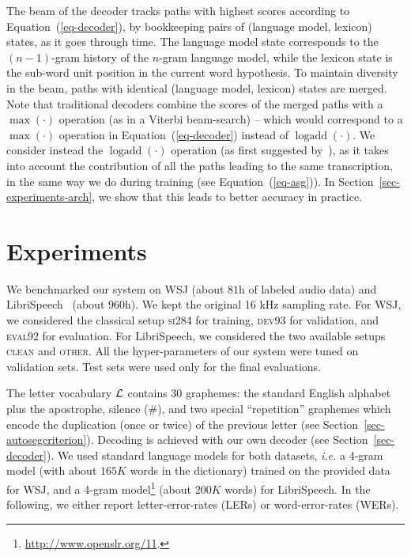 \documentclass{article}
\DeclareMathOperator*{\logadd}{logadd}
\begin{document}
The beam of the decoder tracks paths with highest scores according to
Equation~(\ref{eq-decoder}), by bookkeeping pairs of (language model,
lexicon) states, as it goes through time. The language model state
corresponds to the $(n-1)$-gram history of the $n$-gram language model,
while the lexicon state is the sub-word unit position in the current word
hypothesis. To maintain diversity in the beam, paths with identical
(language model, lexicon) states are merged. Note that traditional decoders
combine the scores of the merged paths with a $\max(\cdot)$ operation (as
in a Viterbi beam-search) -- which would correspond to a $\max(\cdot)$
operation in Equation~(\ref{eq-decoder}) instead of $\logadd(\cdot)$.  We
consider instead the $\logadd(\cdot)$ operation (as first suggested
by~\cite{bottou1991phd}), as it takes into account the contribution of all
the paths leading to the same transcription, in the same way we do during
training (see Equation~(\ref{eq-asg})). In
Section~\ref{sec-experiments-arch}, we show that this leads to better
accuracy in practice.


\section{Experiments}

We benchmarked our system on WSJ (about $81$h of labeled audio data) and
LibriSpeech~\citep{panayotov2015librispeech} (about $960$h). We kept the
original 16 kHz sampling rate. For WSJ, we considered the classical setup
\textsc{si284} for training, \textsc{dev93} for validation, and
\textsc{eval92} for evaluation.  For LibriSpeech, we considered the two
available setups \textsc{clean} and \textsc{other}. All the
hyper-parameters of our system were tuned on validation sets. Test sets
were used only for the final evaluations.

The letter vocabulary ${\cal L}$ contains 30 graphemes: the standard
English alphabet plus the apostrophe, silence (\textsc{\small \#}), and two
special ``repetition'' graphemes which encode the duplication (once or
twice) of the previous letter (see
Section~\ref{sec-autosegcriterion}). Decoding is achieved with our own
decoder (see Section~\ref{sec-decoder}). We used standard language models
for both datasets, \emph{i.e.} a 4-gram model (with about $165K$ words in
the dictionary) trained on the provided data for WSJ, and a 4-gram
model\footnote{\url{http://www.openslr.org/11}.}  (about $200K$ words) for
LibriSpeech. In the following, we either report letter-error-rates (LERs)
or word-error-rates (WERs).
\end{document}
